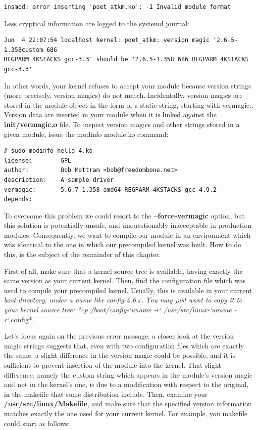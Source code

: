 \documentclass[11pt]{article}
\begin{document}
\begin{verbatim}
insmod: error inserting 'poet_atkm.ko': -1 Invalid module format
\end{verbatim}

Less cryptical information are logged to the systemd journal:

\begin{verbatim}
Jun  4 22:07:54 localhost kernel: poet_atkm: version magic '2.6.5-1.358custom 686
REGPARM 4KSTACKS gcc-3.3' should be '2.6.5-1.358 686 REGPARM 4KSTACKS gcc-3.3'
\end{verbatim}

In other words, your kernel refuses to accept your module because version strings (more precisely, version magics) do not match. Incidentally, version magics are stored in the module object in the form of a static string, starting with vermagic:. Version data are inserted in your module when it is linked against the \textbf{init/vermagic.o} file. To inspect version magics and other strings stored in a given module, issue the modinfo module.ko command:

\begin{verbatim}
# sudo modinfo hello-4.ko
license:        GPL
author:         Bob Mottram <bob@freedombone.net>
description:    A sample driver
vermagic:       5.6.7-1.358 amd64 REGPARM 4KSTACKS gcc-4.9.2
depends:
\end{verbatim}

To overcome this problem we could resort to the \textbf{--force-vermagic} option, but this solution is potentially unsafe, and unquestionably inacceptable in production modules. Consequently, we want to compile our module in an environment which was identical to the one in which our precompiled kernel was built. How to do this, is the subject of the remainder of this chapter.

First of all, make sure that a kernel source tree is available, having exactly the same version as your current kernel. Then, find the configuration file which was used to compile your precompiled kernel. Usually, this is available in your current \emph{boot directory, under a name like config-2.6.x. You may just want to copy it to your kernel source tree: *cp /boot/config-`uname -r` /usr/src/linux-`uname -r`}.config*.

Let's focus again on the previous error message: a closer look at the version magic strings suggests that, even with two configuration files which are exactly the same, a slight difference in the version magic could be possible, and it is sufficient to prevent insertion of the module into the kernel. That slight difference, namely the custom string which appears in the module's version magic and not in the kernel's one, is due to a modification with respect to the original, in the makefile that some distribution include. Then, examine your \textbf{/usr/src/linux/Makefile}, and make sure that the specified version information matches exactly the one used for your current kernel. For example, you makefile could start as follows:
\end{document}
